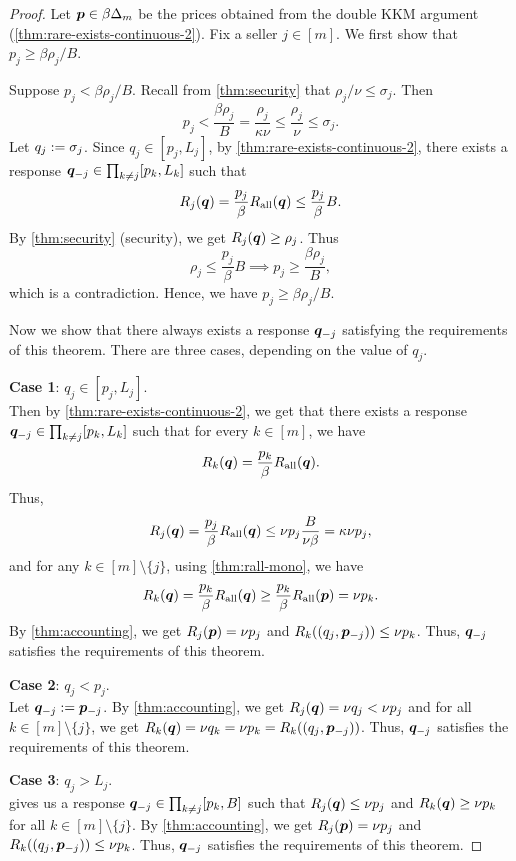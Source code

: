 \begin{proof}
Let $\bm{p} \in \beta\Delta_m$ be the prices obtained from
the double KKM argument (\cref{thm:rare-exists-continuous-2}).
Fix a seller $j \in [m]$. We first show that $p_j \ge \beta\rho_j/B$.

Suppose $p_j < \beta\rho_j/B$. Recall from \cref{thm:security} that $\rho_j/\nu \le \sigma_j$. Then
\[ p_j < \frac{\beta\rho_j}{B} = \frac{\rho_j}{\kappa\nu} \le \frac{\rho_j}{\nu} \le \sigma_j. \]
Let $q_j := \sigma_j$. Since $q_j \in [p_j, L_j]$, by \cref{thm:rare-exists-continuous-2},
there exists a response $\bm{q}_{-j} \in \prod_{k \neq j} [p_k, L_k]$ such that
\[ R_j(\bm{q}) = \frac{p_j}{\beta} R_{\operatorname{all}}(\bm{q}) \le \frac{p_j}{\beta} B. \]
By \cref{thm:security} (security), we get $R_j(\bm{q}) \ge \rho_j$. Thus
\[ \rho_j \le \frac{p_j}{\beta} B \implies p_j \ge \frac{\beta\rho_j}{B}, \]
which is a contradiction. Hence, we have $p_j \ge \beta\rho_j/B$.

Now we show that there always exists a response $\bm{q}_{-j}$ satisfying the requirements of this theorem.
There are three cases, depending on the value of $q_j$.

\textbf{Case 1}: $q_j \in [p_j, L_j]$.
\\ Then by \cref{thm:rare-exists-continuous-2}, we get that there exists a response
$\bm{q}_{-j} \in \prod_{k \neq j} [p_k, L_k]$ such that for every $k \in [m]$, we have
\[ R_k(\bm{q}) = \frac{p_k}{\beta} R_{\operatorname{all}}(\bm{q}). \]
Thus,
\[ R_j(\bm{q}) = \frac{p_j}{\beta} R_{\operatorname{all}}(\bm{q}) \le \nu p_j \frac{B}{\nu\beta} = \kappa \nu p_j, \]
and for any $k \in [m] \setminus \{j\}$, using \cref{thm:rall-mono}, we have
\[ R_k(\bm{q}) = \frac{p_k}{\beta} R_{\operatorname{all}}(\bm{q}) \ge \frac{p_k}{\beta} R_{\operatorname{all}}(\bm{p}) = \nu p_k. \]
By \cref{thm:accounting}, we get $R_j(\bm{p}) = \nu p_j$ and $R_k((q_j, \bm{p}_{-j})) \le \nu p_k$.
Thus, $\bm{q}_{-j}$ satisfies the requirements of this theorem.

\textbf{Case 2}: $q_j < p_j$.
\\ Let $\bm{q}_{-j} := \bm{p}_{-j}$. By \cref{thm:accounting}, we get
$R_j(\bm{q}) = \nu q_j < \nu p_j$ and for all $k \in [m] \setminus \{j\}$,
we get $R_k(\bm{q}) = \nu q_k = \nu p_k = R_k((q_j, \bm{p}_{-j}))$.
Thus, $\bm{q}_{-j}$ satisfies the requirements of this theorem.

\textbf{Case 3}: $q_j > L_j$.
\\  gives us a response $\bm{q}_{-j} \in \prod_{k \neq j} [p_k, B]$
such that $R_j(\bm{q}) \le \nu p_j$ and $R_k(\bm{q}) \ge \nu p_k$ for all $k \in [m] \setminus \{j\}$.
By \cref{thm:accounting}, we get $R_j(\bm{p}) = \nu p_j$ and $R_k((q_j, \bm{p}_{-j})) \le \nu p_k$.
Thus, $\bm{q}_{-j}$ satisfies the requirements of this theorem.
\end{proof}

